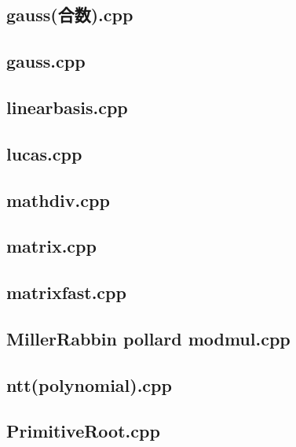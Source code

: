 \subsection{gauss(合数).cpp}


\subsection{gauss.cpp}


\subsection{linearbasis.cpp}


\subsection{lucas.cpp}


\subsection{mathdiv.cpp}


\subsection{matrix.cpp}


\subsection{matrixfast.cpp}


\subsection{MillerRabbin pollard modmul.cpp}


\subsection{ntt(polynomial).cpp}


\subsection{PrimitiveRoot.cpp}



